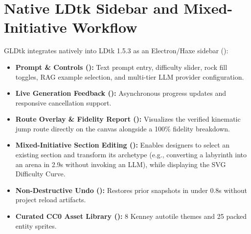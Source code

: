 \documentclass[11pt,a4paper]{report}
\theoremstyle{definition}
\theoremstyle{remark}
\begin{document}
\section{Native LDtk Sidebar and Mixed-Initiative Workflow}
GLDtk integrates natively into LDtk 1.5.3 as an Electron/Haxe sidebar ():
\begin{itemize}
    \item \textbf{Prompt \& Controls ():} Text prompt entry, difficulty slider, rock fill toggles, RAG example selection, and multi-tier LLM provider configuration.
    \item \textbf{Live Generation Feedback ():} Asynchronous progress updates and responsive cancellation support.
    \item \textbf{Route Overlay \& Fidelity Report ():} Visualizes the verified kinematic jump route directly on the canvas alongside a 100\% fidelity breakdown.
    \item \textbf{Mixed-Initiative Section Editing ():} Enables designers to select an existing section and transform its archetype (e.g., converting a labyrinth into an arena in 2.9s without invoking an LLM), while displaying the SVG Difficulty Curve.
    \item \textbf{Non-Destructive Undo ():} Restores prior snapshots in under 0.8s without project reload artifacts.
    \item \textbf{Curated CC0 Asset Library ():} 8 Kenney autotile themes and 25 packed entity sprites.
\end{itemize}
\end{document}
